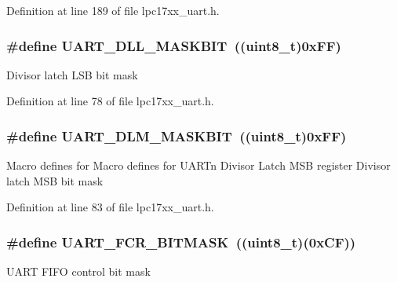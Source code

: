 \-Definition at line 189 of file lpc17xx\-\_\-uart.\-h.

\hypertarget{group___u_a_r_t___private___macros_ga85050a24048ffc2de997cd60ea67f9df}{
\subsubsection[{\-U\-A\-R\-T\-\_\-\-D\-L\-L\-\_\-\-M\-A\-S\-K\-B\-I\-T}]{\setlength{\rightskip}{0pt plus 5cm}\#define {\bf \-U\-A\-R\-T\-\_\-\-D\-L\-L\-\_\-\-M\-A\-S\-K\-B\-I\-T}~((uint8\-\_\-t)0x\-F\-F)}}\label{group___u_a_r_t___private___macros_ga85050a24048ffc2de997cd60ea67f9df}
\-Divisor latch \-L\-S\-B bit mask 

\-Definition at line 78 of file lpc17xx\-\_\-uart.\-h.

\hypertarget{group___u_a_r_t___private___macros_gaf4d480e07f82896893e45b572adeffcd}{
\subsubsection[{\-U\-A\-R\-T\-\_\-\-D\-L\-M\-\_\-\-M\-A\-S\-K\-B\-I\-T}]{\setlength{\rightskip}{0pt plus 5cm}\#define {\bf \-U\-A\-R\-T\-\_\-\-D\-L\-M\-\_\-\-M\-A\-S\-K\-B\-I\-T}~((uint8\-\_\-t)0x\-F\-F)}}\label{group___u_a_r_t___private___macros_gaf4d480e07f82896893e45b572adeffcd}
\-Macro defines for \-Macro defines for \-U\-A\-R\-Tn \-Divisor \-Latch \-M\-S\-B register \-Divisor latch \-M\-S\-B bit mask 

\-Definition at line 83 of file lpc17xx\-\_\-uart.\-h.

\hypertarget{group___u_a_r_t___private___macros_ga2dd6b12c7c237b0a52c6a82698f85b04}{
\subsubsection[{\-U\-A\-R\-T\-\_\-\-F\-C\-R\-\_\-\-B\-I\-T\-M\-A\-S\-K}]{\setlength{\rightskip}{0pt plus 5cm}\#define {\bf \-U\-A\-R\-T\-\_\-\-F\-C\-R\-\_\-\-B\-I\-T\-M\-A\-S\-K}~((uint8\-\_\-t)(0x\-C\-F))}}\label{group___u_a_r_t___private___macros_ga2dd6b12c7c237b0a52c6a82698f85b04}
\-U\-A\-R\-T \-F\-I\-F\-O control bit mask 

